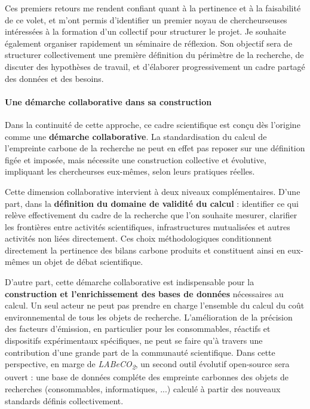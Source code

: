 \documentclass[11pt,a4paper]{article}
\begin{document}
Ces premiers retours me rendent confiant quant à la pertinence et à la faisabilité de ce volet, et m’ont permis d’identifier un premier noyau de chercheurs\textperiodcentered euses intéressé\textperiodcentered es à la formation d'un collectif pour
structurer le projet. Je souhaite également organiser rapidement un séminaire de réflexion.
Son objectif sera de structurer collectivement une première définition du périmètre de la recherche, de discuter des hypothèses de travail,
et d’élaborer progressivement un cadre partagé des données et des besoins.

\paragraph{Une démarche collaborative dans sa construction}

Dans la continuité de cette approche, ce cadre scientifique est conçu dès l’origine comme une \textbf{démarche collaborative}.
La standardisation du calcul de l’empreinte carbone de la recherche ne peut en effet pas reposer sur une définition figée et imposée,
mais nécessite une construction collective et évolutive, impliquant les chercheurs\textperiodcentered es eux-mêmes, selon leurs pratiques réelles.

Cette dimension collaborative intervient à deux niveaux complémentaires.
D’une part, dans la \textbf{définition du domaine de validité du calcul} : identifier ce qui relève effectivement du cadre de la recherche que l'on souhaite mesurer,
clarifier les frontières entre activités scientifiques, infrastructures mutualisées et autres activités non liées directement.
Ces choix méthodologiques conditionnent directement la pertinence des bilans carbone produits et constituent ainsi en eux-mêmes un objet de débat scientifique.

D’autre part, cette démarche collaborative est indispensable pour la \textbf{construction et l’enrichissement des bases de données} nécessaires au calcul.
Un seul acteur ne peut pas prendre en charge l'ensemble du calcul du coût environnemental de tous les objets de recherche.
L’amélioration de la précision des facteurs d’émission, en particulier pour les consommables, réactifs et dispositifs expérimentaux spécifiques,
ne peut se faire qu’à travers une contribution d'une grande part de la communauté scientifique.
Dans cette perspective, en marge de \textit{LABeCO\textsubscript{2}}, un second outil évolutif open-source sera ouvert : une base de données compléte des empreinte carbonnes des objets de recherches (consommables, informatiques, ...)
calculé à partir des nouveaux standards définis collectivement. 
\end{document}
